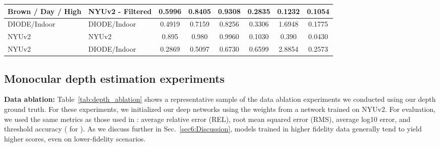 \documentclass[runningheads]{llncs}
\begin{document}
\begin{table}
{\begin{tabular}{|l|l|c|c|c|c|c|c|}
\hline
Brown / Day / High                  & NYUv2 - Filtered              & 0.5996                                            & 0.8405                                            & 0.9308                                            & 0.2835                                         & 0.1232                                         & 0.1054                                            \\ 
\hline
DIODE/Indoor\cite{diodepaper}                & DIODE/Indoor                  & 0.4919                                            & 0.7159                                            & 0.8256                                            & 0.3306                                         & 1.6948                                         & 0.1775                                            \\ 
\hline
NYUv2\cite{Alhashim2018_tf_impl}                       & NYUv2                         & 0.895                                             & 0.980                                             & 0.9960                                            & 0.1030                                         & 0.390                                          & 0.0430                                            \\ 
\hline
NYUv2\cite{Alhashim2018_tf_impl}                     & DIODE/Indoor                  & 0.2869                                            & 0.5097                                            & 0.6730                                            & 0.6599                                         & 2.8854                                         & 0.2573                                            \\
\hline
\end{tabular}
}
\vspace{-1.5em}
\end{table}


\subsection{Monocular depth estimation experiments}
\noindent\textbf{Data ablation:} Table~\ref{tab:depth_ablation} shows a representative sample of the data ablation experiments we conducted using our depth ground truth. For these experiments, we initialized our deep networks using the weights from a network trained on NYUv2. For evaluation, we used the same metrics as those used in \cite{DBLP:journals/corr/EigenPF14_sing_img_depth}: average relative error (REL), root mean squared error (RMS), average log10 error, and threshold accuracy ( for ). As we discuss further in Sec.~\ref{sec6:Discussion}, models trained in higher fidelity data generally tend to yield higher scores, even on lower-fidelity scenarios.
\vspace{0.5em}
\end{document}
